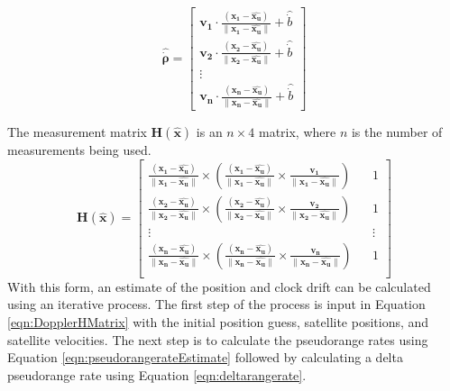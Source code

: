 \documentclass[12pt]{report}
\begin{document}
\begin{equation}
    \mathbf{\hat{\dot{\rho}}} = \begin{bmatrix} 
        \mathbf{v_1} \cdot \frac{(\mathbf{x_1} - \mathbf{\hat{x_u}})}{\| \mathbf{x_1} - \mathbf{\hat{x_u}}\|} + \hat{\dot{b}} \\ 
        \mathbf{v_2} \cdot \frac{(\mathbf{x_2} - \mathbf{\hat{x_u}})}{\| \mathbf{x_2} - \mathbf{\hat{x_u}}\|} + \hat{\dot{b}} \\ 
        \vdots \\
        \mathbf{v_n} \cdot \frac{(\mathbf{x_n} - \mathbf{\hat{x_u}})}{\| \mathbf{x_n} - \mathbf{\hat{x_u}}\|} + \hat{\dot{b}} 
    \end{bmatrix}
    \label{eqn:pseudorangerateEstimate}
\end{equation}

The measurement matrix $\mathbf{H(\mathbf{\hat{x}})}$ is an $n \times 4$ matrix, where $n$ is the number of measurements being used.
\begin{equation}
\mathbf{H(\mathbf{\hat{x}})} = \begin{bmatrix}
    \frac{(\mathbf{x_1} - \mathbf{\hat{x_u}})}{\| \mathbf{x_1} - \mathbf{\hat{x_u}}\|} \times \left(\frac{(\mathbf{x_1} - \mathbf{\hat{x_u}})}{\| \mathbf{x_1} - \mathbf{\hat{x_u}}\|} \times \frac{\mathbf{v_1}}{\| \mathbf{x_1} - \mathbf{\hat{x_u}}\|}\right) && 1 \\
    \frac{(\mathbf{x_2} - \mathbf{\hat{x_u}})}{\| \mathbf{x_2} - \mathbf{\hat{x_u}}\|} \times \left(\frac{(\mathbf{x_2} - \mathbf{\hat{x_u}})}{\| \mathbf{x_2} - \mathbf{\hat{x_u}}\|} \times \frac{\mathbf{v_2}}{\| \mathbf{x_2} - \mathbf{\hat{x_u}}\|}\right) && 1 \\
    \vdots && \vdots\\
    \frac{(\mathbf{x_n} - \mathbf{\hat{x_u}})}{\| \mathbf{x_n} - \mathbf{\hat{x_u}}\|} \times \left(\frac{(\mathbf{x_n} - \mathbf{\hat{x_u}})}{\| \mathbf{x_n} - \mathbf{\hat{x_u}}\|} \times \frac{\mathbf{v_n}}{\| \mathbf{x_n} - \mathbf{\hat{x_u}}\|}\right) && 1 \\
\end{bmatrix}
\label{eqn:DopplerHMatrix}
\end{equation}
With this form, an estimate of the position and clock drift can be calculated using an iterative process. The first step of the process is input in Equation \ref{eqn:DopplerHMatrix} with the initial position guess, satellite positions, and satellite velocities. The next step is to calculate the pseudorange rates using Equation \ref{eqn:pseudorangerateEstimate} followed by calculating a delta pseudorange rate using Equation \ref{eqn:deltarangerate}.
\end{document}
